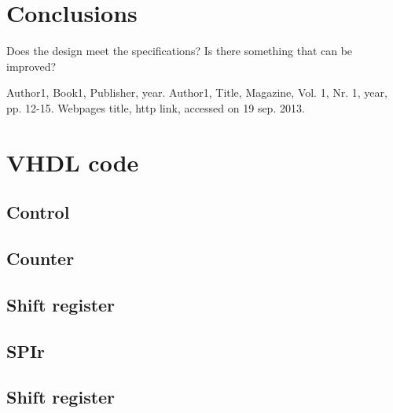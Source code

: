 \documentclass[11pt,twoside,a4paper]{article}
\begin{document}
\section{Conclusions}
Does the design meet the specifications?
Is there something that can be improved?

\begin{thebibliography}{9}
Author1, 
Book1, 
Publisher, 
year.
Author1, 
Title, 
Magazine, 
Vol. 1, 
Nr. 1, 
year, 
pp. 12-15.
Webpages title, 
http link, 
accessed on 19 sep. 2013.
\end{thebibliography}

\section{VHDL code}
\subsection{Control}
\label{control-vhdl}
 
\subsection{Counter}
\label{counter-vhdl}
 
\subsection{Shift register}
\label{shift-reg-vhdl}
 
\subsection{SPIr}
\label{spi-vhdl}
 
\subsection{Shift register}
\label{spi-tb-vhdl}
 
\end{document}
